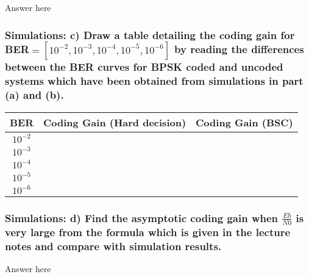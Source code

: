 \documentclass[a4paper]{report}
\begin{document}
Answer here \\

\subsubsection*{Simulations: c) Draw a table detailing the coding gain for BER$= [10^{−2}, 10^{−3}, 10^{−4} , 10^{−5} , 10^{−6} ]$ by reading the differences between the BER curves for BPSK coded and uncoded systems which have been obtained from simulations in part (a) and (b).}

\begin{tabular}{| c | c | c |}
\hline
BER & Coding Gain (Hard decision) & Coding Gain (BSC) \\
\hline
$10^{-2}$ & & \\
\hline
$10^{-3}$ & & \\
\hline
$10^{-4}$ & & \\
\hline
$10^{-5}$ & & \\
\hline
$10^{-6}$ & & \\
\hline
\end{tabular}

\subsubsection*{Simulations: d) Find the asymptotic coding gain when $\frac{Eb}{N0}$ is very large from the formula which is given in the lecture notes and compare with simulation results.}

Answer here \\
\end{document}
